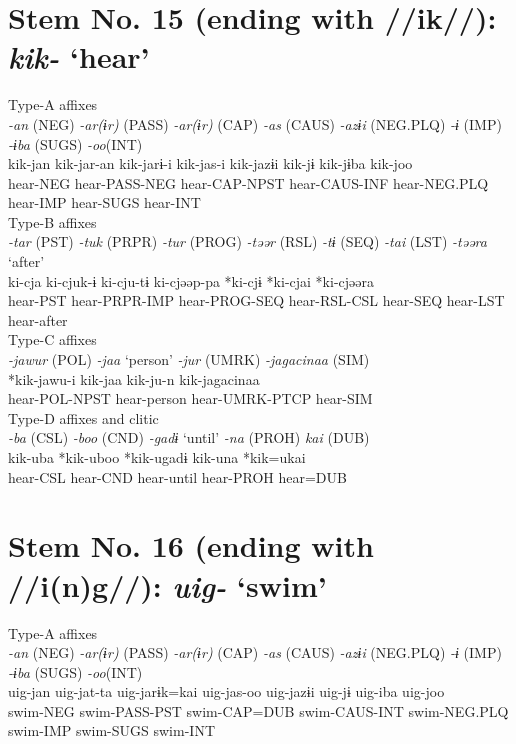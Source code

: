 \section{Stem No. 15 (ending with //ik//): \textit{kik-} ‘hear’}

\ea Type-A affixes\\
\glll \textit{-an} (NEG)  \textit{-ar(ɨr)} (PASS)  \textit{-ar(ɨr)} (CAP)  \textit{-as} (CAUS)  \textit{-azɨi} (NEG.PLQ)  \textit{-ɨ} (IMP)  \textit{-ɨba} (SUGS)  \textit{-oo}(INT)\\
kik-jan  kik-jar-an  kik-jarɨ-i  kik-jas-i  kik-jazɨi  kik-jɨ  kik-jɨba  kik-joo\\
hear-NEG  hear-PASS-NEG  hear-CAP-NPST  hear-CAUS-INF  hear-NEG.PLQ  hear-IMP  hear-SUGS  hear-INT\\


\ex Type-B affixes\\
\glll \textit{-tar} (PST)  \textit{-tuk} (PRPR)  \textit{-tur} (PROG)  \textit{-təər} (RSL)  \textit{-tɨ} (SEQ)  \textit{-tai} (LST)  \textit{-təəra} ‘after’\\
ki-cja  ki-cjuk-ɨ  ki-cju-tɨ  ki-cjəəp-pa  *ki-cjɨ  *ki-cjai  *ki-cjəəra\\
hear-PST  hear-PRPR-IMP  hear-PROG-SEQ  hear-RSL-CSL  hear-SEQ  hear-LST  hear-after\\


\ex Type-C affixes\\
\glll \textit{-jawur} (POL)  \textit{-jaa} ‘person’  \textit{-jur} (UMRK)  \textit{-jagacinaa} (SIM)\\
*kik-jawu-i  kik-jaa  kik-ju-n  kik-jagacinaa\\
hear-POL-NPST  hear-person  hear-UMRK-PTCP  hear-SIM\\


\ex Type-D affixes and clitic\\
\glll \textit{-ba} (CSL)  \textit{-boo} (CND)  \textit{-gadɨ} ‘until’  \textit{-na} (PROH)  \textit{kai} (DUB)\\
kik-uba  *kik-uboo  *kik-ugadɨ  kik-una  *kik=ukai\\
hear-CSL  hear-CND  hear-until  hear-PROH  hear=DUB\\
\z

\section{Stem No. 16 (ending with //i(n)g//): \textit{uig-} ‘swim’}

\ea Type-A affixes\\
\glll \textit{-an} (NEG)  \textit{-ar(ɨr)} (PASS)  \textit{-ar(ɨr)} (CAP)  \textit{-as} (CAUS)  \textit{-azɨi} (NEG.PLQ)  \textit{-ɨ} (IMP)  \textit{-ɨba} (SUGS)  \textit{-oo}(INT)\\
uig-jan  uig-jat-ta  uig-jarɨk=kai  uig-jas-oo  uig-jazɨi  uig-jɨ  uig-iba  uig-joo\\
swim-NEG  swim-PASS-PST  swim-CAP=DUB  swim-CAUS-INT  swim-NEG.PLQ  swim-IMP  swim-SUGS  swim-INT\\



